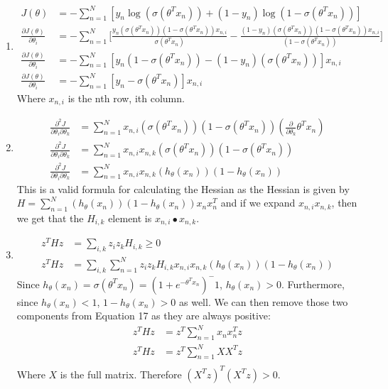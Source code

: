 \documentclass[11pt]{article}
\newcommand{\solution}[1]{{{\color{blue}{\bf Solution:} {#1}}}}
\begin{document}
\begin{enumerate}
\item

\solution{
\begin{align}
J(\theta) &= -\sum_{n=1}^{N}[y_n \log (\sigma(\theta^T x_n)) + (1-y_n)\log(1-\sigma(\theta^T x_n))] \\
\tfrac{\partial J(\theta)}{\partial \theta_i} &= -\sum_{n=1}^{N}\bigg[\tfrac{y_n(\sigma(\theta^T x_n))(1-\sigma(\theta^T x_n))x_{n,i}}{\sigma(\theta^T x_n)}-\tfrac{(1-y_n)(\sigma(\theta^T x_n))(1-\sigma(\theta^T x_n))x_{n,i}}{(1-\sigma(\theta^T x_n))}\bigg] \\
\tfrac{\partial J(\theta)}{\partial \theta_i} &= -\sum_{n=1}^{N} [y_n(1-\sigma(\theta^T x_n))-(1-y_n)(\sigma(\theta^T x_n))]x_{n,i} \\
\tfrac{\partial J(\theta)}{\partial \theta_i} &= -\sum_{n=1}^{N} [y_n-\sigma(\theta^T x_n)]x_{n,i}
\end{align}
Where $x_{n, i}$ is the nth row, ith column.
}
\vspace{1cm}

\item
\solution{
\begin{align}
\tfrac{\partial^2 J}{\partial \theta_i \partial \theta_k} &=\sum_{n=1}^{N} x_{n,i}(\sigma(\theta^T x_n)) (1-\sigma(\theta^T x_n))(\tfrac{\partial }{\partial \theta_k}\theta^T x_n) \\
\tfrac{\partial^2 J}{\partial \theta_i \partial \theta_k} &=\sum_{n=1}^{N} x_{n,i}x_{n,k}(\sigma(\theta^T x_n)) (1-\sigma(\theta^T x_n)) \\
\tfrac{\partial^2 J}{\partial \theta_i \partial \theta_k} &=\sum_{n=1}^{N} x_{n,i}x_{n,k}(h_\theta(x_n))(1-h_\theta(x_n)) 
\end{align}
This is a valid formula for calculating the Hessian as the Hessian is given by $H = \sum_{n=1}^{N} (h_\theta(x_n))(1-h_\theta(x_n))x_n x_n^T$ and if we expand $x_{n,i}x_{n,k}$, then we get that the $H_{i,k}$ element is $x_{n,i}\bullet x_{n,k}$.
}
\newpage

\item
\solution{
\begin{align}
z^THz &= \sum_{i,k}z_i z_k H_{i,k} \geq 0 \\
z^THz &= \sum_{i,k} \sum_{n=1}^{N} z_i z_k H_{i,k} x_{n,i}x_{n,k}(h_\theta(x_n))(1-h_\theta(x_n))
\end{align}
Since $h_\theta(x_n) = \sigma(\theta^Tx_n) = (1+e^{-\theta^T x_n})^-1$, $h_\theta(x_n) > 0$. Furthermore, since $h_\theta(x_n) < 1$, $1-h_\theta(x_n) > 0$ as well. We can then remove those two components from Equation 17 as they are always positive:
\begin{align}
z^THz &= z^T \sum_{n=1}^{N} x_n x_n^T z \\
z^THz &= z^T \sum_{n=1}^{N} XX^T z \\
\end{align}
Where $X$ is the full matrix. Therefore $(X^Tz)^T(X^Tz) > 0$.
}
\end{enumerate}
\newpage
\end{document}
